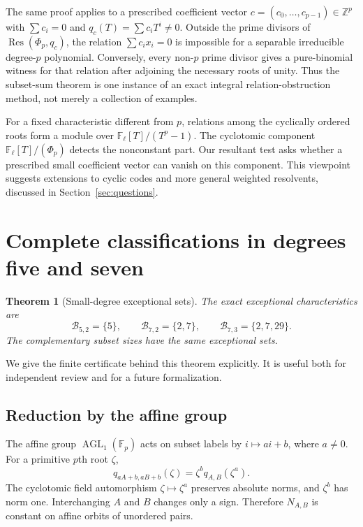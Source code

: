 \documentclass[11pt,a4paper]{article}
\newtheorem{theorem}{Theorem}[section]
\theoremstyle{definition}
\theoremstyle{remark}
\newcommand{\Z}{\mathbb Z}
\newcommand{\F}{\mathbb F}
\newcommand{\Res}{\operatorname{Res}}
\newcommand{\AGL}{\operatorname{AGL}}
\begin{document}
The same proof applies to a prescribed coefficient vector
$c=(c_0,\ldots,c_{p-1})\in\Z^p$ with $\sum c_i=0$ and
$q_c(T)=\sum c_iT^i\neq0$. Outside the prime divisors of
$\Res(\Phi_p,q_c)$, the relation
$\sum c_i x_i=0$ is impossible for a separable irreducible degree-$p$
polynomial. Conversely, every non-$p$ prime divisor gives a pure-binomial
witness for that relation after adjoining the necessary roots of unity.
Thus the subset-sum theorem is one instance of an exact integral
relation-obstruction method, not merely a collection of examples.

For a fixed characteristic different from $p$, relations among the
cyclically ordered roots form a module over
$\F_\ell[T]/(T^p-1)$. The cyclotomic component
$\F_\ell[T]/(\Phi_p)$ detects the nonconstant part. Our resultant test asks
whether a prescribed small coefficient vector can vanish on this component.
This viewpoint suggests extensions to cyclic codes and more general
weighted resolvents, discussed in Section~\ref{sec:questions}.

\section{Complete classifications in degrees five and seven}
\label{sec:tables}

\begin{theorem}[Small-degree exceptional sets]\label{thm:small}
The exact exceptional characteristics are
\[
 \boxed{\mathcal B_{5,2}=\{5\}},\qquad
 \boxed{\mathcal B_{7,2}=\{2,7\}},\qquad
 \boxed{\mathcal B_{7,3}=\{2,7,29\}}.
\]
The complementary subset sizes have the same exceptional sets.
\end{theorem}

We give the finite certificate behind this theorem explicitly. It is useful
both for independent review and for a future formalization.

\subsection{Reduction by the affine group}

The affine group $\AGL_1(\F_p)$ acts on subset labels by
$i\mapsto ai+b$, where $a\neq0$. For a primitive $p$th root $\zeta$,
\[
 q_{aA+b,aB+b}(\zeta)=\zeta^b q_{A,B}(\zeta^a).
\]
The cyclotomic field automorphism $\zeta\mapsto\zeta^a$ preserves absolute
norms, and $\zeta^b$ has norm one. Interchanging $A$ and $B$ changes only a
sign. Therefore $N_{A,B}$ is constant on affine orbits of unordered pairs.
\end{document}
